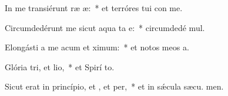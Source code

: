 \item In me transiérunt ræ æ:~* et terróres tui con me.
\item Circumdedérunt me sicut aqua ta e:~* circumdedé  mul.
\item Elongásti a me acum et ximum:~* et notos meos  a.
\item Glória tri, et lio,~* et Spirí to.
\item Sicut erat in princípio, et , et per,~* et in sǽcula sæcu. men.
